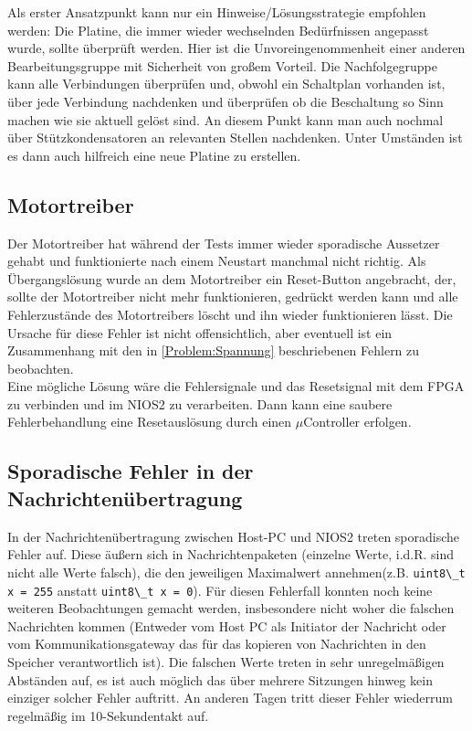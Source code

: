 Als erster Ansatzpunkt kann nur ein Hinweise/Lösungsstrategie empfohlen werden: Die Platine, die immer wieder wechselnden Bedürfnissen angepasst wurde, sollte überprüft werden. Hier ist die Unvoreingenommenheit einer anderen Bearbeitungsgruppe mit Sicherheit von großem Vorteil. Die Nachfolgegruppe kann alle Verbindungen überprüfen und, obwohl ein Schaltplan vorhanden ist, über jede Verbindung nachdenken und überprüfen ob die Beschaltung so Sinn machen wie sie aktuell gelöst sind. An diesem Punkt kann man auch nochmal über Stützkondensatoren an relevanten Stellen nachdenken. Unter Umständen ist es dann auch hilfreich eine neue Platine zu erstellen.

\subsection{Motortreiber}
Der Motortreiber hat während der Tests immer wieder sporadische Aussetzer gehabt und funktionierte nach einem Neustart manchmal nicht richtig. Als Übergangslösung wurde an dem Motortreiber ein Reset-Button angebracht, der, sollte der Motortreiber nicht mehr funktionieren, gedrückt werden kann und alle Fehlerzustände des Motortreibers löscht und ihn wieder funktionieren lässt.
Die Ursache für diese Fehler ist nicht offensichtlich, aber eventuell ist ein Zusammenhang mit den in \ref{Problem:Spannung} beschriebenen Fehlern zu beobachten.\\
Eine mögliche Lösung wäre die Fehlersignale und das Resetsignal mit dem \ac{FPGA} zu verbinden und im NIOS2 zu verarbeiten. Dann kann eine saubere Fehlerbehandlung eine Resetauslösung durch einen $\mu$Controller erfolgen.

\subsection{Sporadische Fehler in der Nachrichtenübertragung}
In der Nachrichtenübertragung zwischen Host-PC und NIOS2 treten sporadische Fehler auf. Diese äußern sich in Nachrichtenpaketen (einzelne Werte, i.d.R. sind nicht alle Werte falsch), die den jeweiligen Maximalwert annehmen(z.B. \lstinline|uint8\_t x = 255| anstatt \lstinline|uint8\_t x = 0|). Für diesen Fehlerfall konnten noch keine weiteren Beobachtungen gemacht werden, insbesondere nicht woher die falschen Nachrichten kommen (Entweder vom Host PC als Initiator der Nachricht oder vom Kommunikationsgateway das für das kopieren von Nachrichten in den Speicher verantwortlich ist). Die falschen Werte treten in sehr unregelmäßigen Abständen auf, es ist auch möglich das über mehrere Sitzungen hinweg kein einziger solcher Fehler auftritt. An anderen Tagen tritt dieser Fehler wiederrum regelmäßig im 10-Sekundentakt auf.

